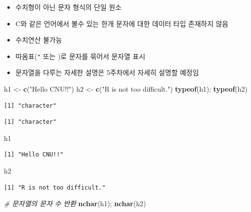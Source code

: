 \documentclass[
  11pt,
]{krantz}
\newenvironment{Shaded}{\begin{snugshade}}{\end{snugshade}}
\newcommand{\CommentTok}[1]{\textcolor[rgb]{0.37,0.37,0.37}{\textit{#1}}}
\newcommand{\KeywordTok}[1]{\textcolor[rgb]{0.27,0.27,0.27}{\textbf{#1}}}
\newcommand{\NormalTok}[1]{#1}
\newcommand{\StringTok}[1]{\textcolor[rgb]{0.5,0.5,0.5}{#1}}
\providecommand{\tightlist}{%
  \setlength{\itemsep}{0pt}\setlength{\parskip}{0pt}}
\begin{document}
\begin{itemize}
\tightlist
\item
  수치형이 아닌 문자 형식의 단일 원소
\item
  C와 같은 언어에서 볼수 있는 한개 문자에 대한 데이터 타입 존재하지 않음
\item
  수치연산 불가능
\item
  따옴표(\texttt{"} 또는 \texttt{\textquotesingle{}})로 문자를 묶어서 문자열 표시
\item
  문자열을 다루는 자세한 설명은 5주차에서 자세히 설명할 예정임
\end{itemize}

\footnotesize

\begin{Shaded}
\begin{Highlighting}[]
\NormalTok{h1 <-}\StringTok{ }\KeywordTok{c}\NormalTok{(}\StringTok{"Hello CNU!!"}\NormalTok{)}
\NormalTok{h2 <-}\StringTok{ }\KeywordTok{c}\NormalTok{(}\StringTok{"R is not too difficult."}\NormalTok{)}
\KeywordTok{typeof}\NormalTok{(h1); }\KeywordTok{typeof}\NormalTok{(h2)}
\end{Highlighting}
\end{Shaded}

\begin{verbatim}
[1] "character"
\end{verbatim}

\begin{verbatim}
[1] "character"
\end{verbatim}

\begin{Shaded}
\begin{Highlighting}[]
\NormalTok{h1}
\end{Highlighting}
\end{Shaded}

\begin{verbatim}
[1] "Hello CNU!!"
\end{verbatim}

\begin{Shaded}
\begin{Highlighting}[]
\NormalTok{h2}
\end{Highlighting}
\end{Shaded}

\begin{verbatim}
[1] "R is not too difficult."
\end{verbatim}

\begin{Shaded}
\begin{Highlighting}[]
\CommentTok{# 문자열의 문자 수 반환}
\KeywordTok{nchar}\NormalTok{(h1); }\KeywordTok{nchar}\NormalTok{(h2)}
\end{Highlighting}
\end{Shaded}
\end{document}
